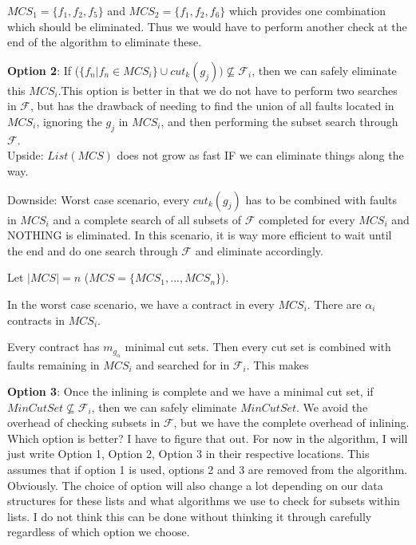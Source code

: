 $MCS_1 = \{f_1,f_2,f_5\}$ and $MCS_2 = \{f_1,f_2,f_6\}$ which provides one combination which should be eliminated. Thus we would have to perform another check at the end of the algorithm to eliminate these. 


\textbf{Option 2}: If ($\{f_n | f_n \in MCS_i\} \cup cut_k(g_j)) \not \subseteq  \mathcal{F}_i $, then we can safely eliminate this $MCS_i$.This option is better in that we do not have to perform two searches in $\mathcal{F}$, but has the drawback of needing to find the union of all faults located in $MCS_i$, ignoring the $g_j$ in $MCS_i$, and then performing the subset search through $\mathcal{F}$. \\

Upside: $List(MCS)$ does not grow as fast IF we can eliminate things along the way.

Downside: Worst case scenario, every $cut_k(g_j)$ has to be combined with faults in $MCS_i$ and a complete search of all subsets of $\mathcal{F}$ completed for every $MCS_i$ and NOTHING is eliminated. In this scenario, it is way more efficient to wait until the end and do one search through $\mathcal{F}$ and eliminate accordingly. 

Let $|MCS| = n$ ($MCS = \{MCS_1,...,MCS_n\}$). 

In the worst case scenario, we have a contract in every $MCS_i$. There are $\alpha_i$ contracts in $MCS_i$. 

Every contract has $m_{g_\alpha}$ minimal cut sets. Then every cut set is combined with faults remaining in $MCS_i$ and searched for in $\mathcal{F}_i$. This makes 



\textbf{Option 3}: Once the inlining is complete and we have a minimal cut set, if $MinCutSet \not \subseteq \mathcal{F}_i $, then we can safely eliminate $MinCutSet$. We avoid the overhead of checking subsets in $\mathcal{F}$, but we have the complete overhead of inlining. \\

Which option is better? I have to figure that out. For now in the algorithm, I will just write Option 1, Option 2, Option 3 in their respective locations. This assumes that if option 1 is used, options 2 and 3 are removed from the algorithm. Obviously. The choice of option will also change a lot depending on our data structures for these lists and what algorithms we use to check for subsets within lists. I do not think this can be done without thinking it through carefully regardless of which option we choose. \\

